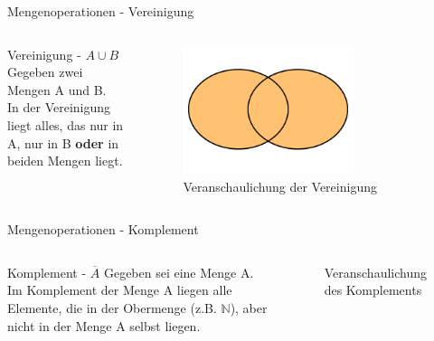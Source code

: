 \begin{frame}{Mengenoperationen - Vereinigung}
\begin{columns}
    \begin{alertblock}{Vereinigung - $A\cup B$}
    Gegeben zwei Mengen A und B.\\
    In der Vereinigung liegt alles, das nur in A, nur in B \textbf{oder} in beiden Mengen liegt.
    \end{alertblock}
\begin{figure}
    \centering
    \includegraphics[width=0.7\textwidth]{../figures/AoderB.png}
    \caption{Veranschaulichung der Vereinigung}
    \label{fig:my_label}
\end{figure}
\end{columns}
\end{frame}

\begin{frame}{Mengenoperationen - Komplement}
    \begin{columns}
    \begin{alertblock}{Komplement - $\overline{A}$}
    Gegeben sei eine Menge A.\\
    Im Komplement der Menge A liegen alle Elemente, die in der Obermenge (z.B. $\mathbb{N}$), aber nicht in der Menge A selbst liegen.
    \end{alertblock}
\begin{figure}
    \centering
    
    \caption{Veranschaulichung des Komplements}
    \label{fig:komplement}
\end{figure}
\end{columns}
\end{frame}

